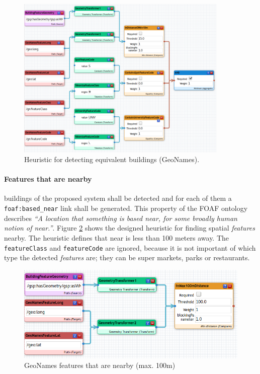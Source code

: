 \documentclass[draft,final]{vutinfth} %
\begin{document}
\begin{figure}[h]
    \centering
    \includegraphics[width=0.9\textwidth]{graphics/linking/geoNamesFeatureSameAs.png}
    \caption{Heuristic for detecting equivalent buildings (GeoNames).}
    \label{fig:solution-architectural-prototype:ld-management:geonames-equivalent}
\end{figure}

\paragraph{Features that are nearby} buildings of the proposed system shall be detected and for each of them a \texttt{foaf:based\_near} link shall be generated. This property of the FOAF ontology describes \textit{``A location that something is based near, for some broadly human notion of near.''}\cite{brickley_foaf_2012}. Figure \ref{fig:solution-architectural-prototype:ld-management:linking:gnNearBy} shows the designed heuristic for finding spatial \textit{features} nearby. The heuristic defines that near is less than 100 meters away. The \texttt{featureClass} and \texttt{featureCode} are ignored, because it is not important of which type the detected \textit{features} are; they can be super markets, parks or restaurants.

\begin{figure}[h]
    \centering
    \includegraphics[width=1.0\textwidth]{graphics/linking/geonamesFeatureNearByLinking.png}
    \caption{GeoNames features that are nearby (max. 100m)}
    \label{fig:solution-architectural-prototype:ld-management:linking:gnNearBy}
\end{figure}
\end{document}
